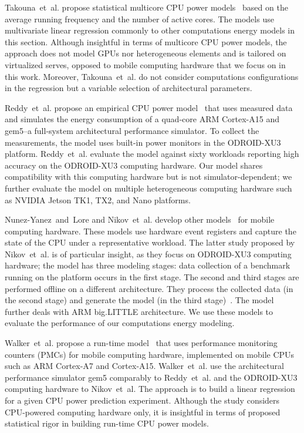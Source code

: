Takouna~et~al. propose statistical multicore CPU power models~\citep{takouna2011accurate} based on the average running frequency and the number of active cores. The models use multivariate linear regression commonly to other computations energy models in this section. Although insightful in terms of multicore CPU power models, the approach does not model GPUs nor heterogeneous elements and is tailored on virtualized serves, opposed to mobile computing hardware that we focus on in this work. Moreover, Takouna~et~al. do not consider computations configurations in the regression but a variable selection of architectural parameters.

Reddy~et~al. propose an empirical CPU power model~\citep{reddy2017empirical} that uses measured data and simulates the energy consumption of a quad-core ARM Cortex-A15 and gem5--a full-system architectural performance simulator. To collect the measurements, the model uses built-in power monitors in the ODROID-XU3 platform. Reddy~et~al. evaluate the model against sixty workloads reporting high accuracy on the ODROID-XU3 computing hardware. Our model shares compatibility with this computing hardware but is not simulator-dependent; we further evaluate the model on multiple heterogeneous computing hardware such as NVIDIA Jetson TK1, TX2, and Nano platforms.

Nunez-Yanez~and~Lore and Nikov~et~al. develop other models~\citep{nunez2013enabling,nikov2015evaluation} for mobile computing hardware. These models use hardware event registers and capture the state of the CPU under a representative workload. The latter study proposed by Nikov~et~al. is of particular insight, as they focus on ODROID-XU3 computing hardware; the model has three modeling stages: data collection of a benchmark running on the platform occurs in the first stage. The second and third stages are performed offline on a different architecture. They process the collected data (in the second stage) and generate the model (in the third stage)~\citep{seewald2019coarse}. The model further deals with ARM big.LITTLE architecture. We use these models to evaluate the performance of our computations energy modeling.

Walker~et~al. propose a run-time model~\citep{walker2017accurate} that uses performance monitoring counters (PMCs) for mobile computing hardware, implemented on mobile CPUs such as ARM Cortex-A7 and Cortex-A15.  Walker~et~al. use the architectural performance simulator gem5 comparably to Reddy~et~al. and the ODROID-XU3 computing hardware to Nikov~et~al. The approach is to build a linear regression for a given CPU power prediction experiment. Although the study considers CPU-powered computing hardware only, it is insightful in terms of proposed statistical rigor in building run-time CPU power models.


